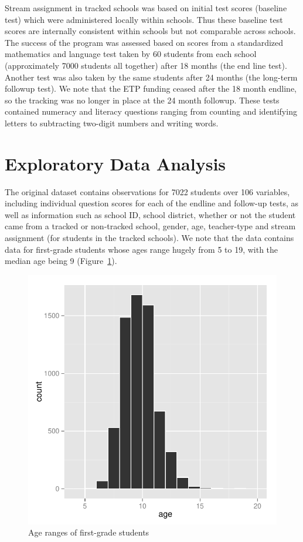 \documentclass[11pt]{article}
\begin{document}
Stream assignment in tracked schools was based on initial test scores (baseline test) which were administered locally within schools. Thus these baseline test scores are internally consistent within schools but not comparable across schools. The success of the program was assessed based on scores from a standardized mathematics and language test taken by 60 students from each school (approximately 7000 students all together) after 18 months (the end line test). Another test was also taken by the same students after 24 months (the long-term followup test). We note that the ETP funding ceased after the 18 month endline, so the tracking was no longer in place at the 24 month followup. These tests contained numeracy and literacy questions ranging from counting and identifying letters to subtracting two-digit numbers and writing words.
 
 \section{Exploratory Data Analysis}
 The original dataset contains observations for 7022 students over 106 variables, including individual question scores for each of the endline and follow-up tests, as well as information such as school ID, school district, whether or not the student came from a tracked or non-tracked school, gender, age, teacher-type and stream assignment (for students in the tracked schools). We note that the data contains data for first-grade students whose ages range hugely from 5 to 19, with the median age being 9 (Figure~\ref{fig:age}).
 
  \begin{figure}[h]
 \centering
 \includegraphics[scale=0.6]{age.pdf}
 \caption{Age ranges of first-grade students}
 \label{fig:age}
 \end{figure} 
 
\end{document}
